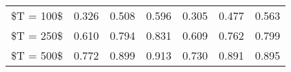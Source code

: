 % 
\begin{tabular}{ccccccc}
  \hline
  \hline
\$T = 100\$ & 0.326 & 0.508 & 0.596 & 0.305 & 0.477 & 0.563 \\ 
  \$T = 250\$ & 0.610 & 0.794 & 0.831 & 0.609 & 0.762 & 0.799 \\ 
  \$T = 500\$ & 0.772 & 0.899 & 0.913 & 0.730 & 0.891 & 0.895 \\ 
   \hline
\end{tabular}
